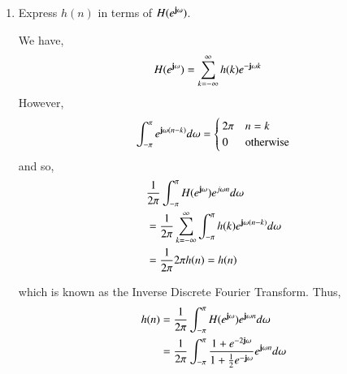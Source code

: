 \documentclass[journal,12pt,twocolumn]{IEEEtran}
\renewcommand\thesection{\arabic{section}}
\begin{document}
\begin{enumerate}[label=\thesection.\arabic*]
\item Express $h(n)$ in terms of $H(e^{\mathbf{j}\omega})$.

\solution We have,
\begin{align}
	H(e^{\mathbf{j}\omega}) &= \sum_{k = -\infty}^{\infty}h(k)e^{-\mathbf{j}\omega k}
\end{align}
However,
\begin{align}
	\int_{-\pi}^{\pi}e^{\mathbf{j}\omega(n - k)}d\omega =
	\begin{cases}
		2\pi & n = k \\
		0 & \textrm{otherwise}
	\end{cases}
\end{align}
and so,
\begin{align}
	&\frac{1}{2\pi}\int_{-\pi}^{\pi}H(e^{\mathbf{j}\omega})e^{j\omega n}d\omega \\
	&= \frac{1}{2\pi}\sum_{k = -\infty}^{\infty}\int_{-\pi}^{\pi}h(k)e^{\mathbf{j}\omega(n - k)}d\omega \\
	&= \frac{1}{2\pi}2\pi h(n) = h(n)
\end{align}

which is known as the Inverse Discrete Fourier Transform. Thus,
\begin{align}
	h(n) &= \frac{1}{2\pi}\int_{-\pi}^{\pi}H(e^{\mathbf{j}\omega})e^{\mathbf{j}\omega n}d\omega \\
		 &= \frac{1}{2\pi}\int_{-\pi}^{\pi}\frac{1 + e^{-2\mathbf{j}\omega}}{1 + \frac{1}{2}e^{-\mathbf{j}\omega}}e^{\mathbf{j}\omega n}d\omega
	\label{eq:idtft}
\end{align}
\end{enumerate}
\end{document}
